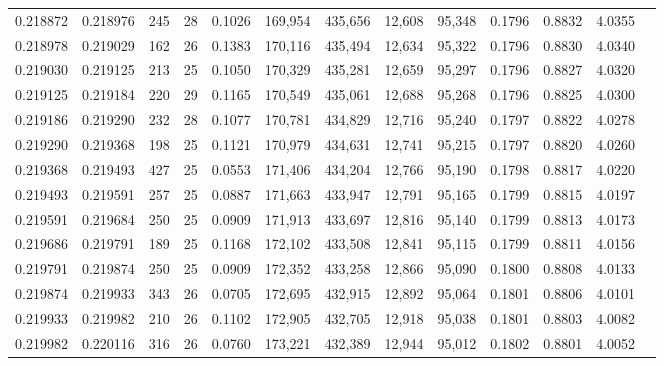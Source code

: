 \begin{tabular}{rrrrrrrrrrrrr}
0.218872 & 0.218976 &   245 &  28 &                                     0.1026 & 169,954 & 435,656 &  12,608 &  95,348 & 0.1796 & 0.8832 & 4.0355 \\
0.218978 & 0.219029 &   162 &  26 &                                     0.1383 & 170,116 & 435,494 &  12,634 &  95,322 & 0.1796 & 0.8830 & 4.0340 \\
0.219030 & 0.219125 &   213 &  25 &                                     0.1050 & 170,329 & 435,281 &  12,659 &  95,297 & 0.1796 & 0.8827 & 4.0320 \\
0.219125 & 0.219184 &   220 &  29 &                                     0.1165 & 170,549 & 435,061 &  12,688 &  95,268 & 0.1796 & 0.8825 & 4.0300 \\
0.219186 & 0.219290 &   232 &  28 &                                     0.1077 & 170,781 & 434,829 &  12,716 &  95,240 & 0.1797 & 0.8822 & 4.0278 \\
0.219290 & 0.219368 &   198 &  25 &                                     0.1121 & 170,979 & 434,631 &  12,741 &  95,215 & 0.1797 & 0.8820 & 4.0260 \\
0.219368 & 0.219493 &   427 &  25 &                                     0.0553 & 171,406 & 434,204 &  12,766 &  95,190 & 0.1798 & 0.8817 & 4.0220 \\
0.219493 & 0.219591 &   257 &  25 &                                     0.0887 & 171,663 & 433,947 &  12,791 &  95,165 & 0.1799 & 0.8815 & 4.0197 \\
0.219591 & 0.219684 &   250 &  25 &                                     0.0909 & 171,913 & 433,697 &  12,816 &  95,140 & 0.1799 & 0.8813 & 4.0173 \\
0.219686 & 0.219791 &   189 &  25 &                                     0.1168 & 172,102 & 433,508 &  12,841 &  95,115 & 0.1799 & 0.8811 & 4.0156 \\
0.219791 & 0.219874 &   250 &  25 &                                     0.0909 & 172,352 & 433,258 &  12,866 &  95,090 & 0.1800 & 0.8808 & 4.0133 \\
0.219874 & 0.219933 &   343 &  26 &                                     0.0705 & 172,695 & 432,915 &  12,892 &  95,064 & 0.1801 & 0.8806 & 4.0101 \\
0.219933 & 0.219982 &   210 &  26 &                                     0.1102 & 172,905 & 432,705 &  12,918 &  95,038 & 0.1801 & 0.8803 & 4.0082 \\
0.219982 & 0.220116 &   316 &  26 &                                     0.0760 & 173,221 & 432,389 &  12,944 &  95,012 & 0.1802 & 0.8801 & 4.0052 \\

\end{tabular}
